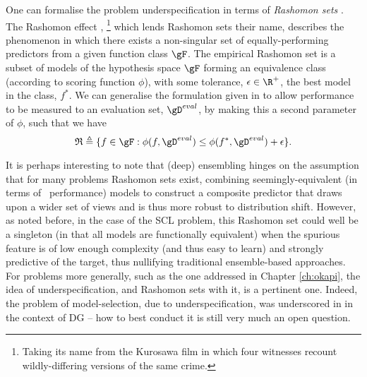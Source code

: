 %
One can formalise the problem underspecification in terms of \emph{Rashomon sets}
\citep{semenova2019study}.
The Rashomon effect \citep{breiman2001statistical},
%
\footnote{Taking its name from the Kurosawa film
in which four witnesses recount wildly-differing versions of the same crime.}
%
which lends Rashomon sets their name, describes the phenomenon in which there exists a
non-singular set of equally-performing predictors from a given function class $\gF$.
%
 The empirical Rashomon set is a subset of models of the hypothesis space $\gF$ forming an
 equivalence class (according to scoring function $\phi$), with some tolerance, $\epsilon \in \R^+$, \wrt{}
 the best model in the class, $f^\ast$. 
%
We can generalise the formulation given in \citet{semenova2019study} to allow performance to be
measured \wrt{} to an evaluation set,  $\gD^{eval}$, by making this a second parameter of
$\phi$, such that we have
%
\begin{equation*}
  \mathfrak{R} \triangleq 
  \{ 
    f \in \gF: \phi(f, \gD^{eval}) 
    \leq 
    \phi( f^\ast, \gD^{eval} ) + \epsilon 
  \}.
\end{equation*}

It is perhaps interesting to note that (deep) ensembling hinges on the assumption that for many
problems Rashomon sets exist, combining seemingly-equivalent (in terms of \iid{}\ performance)
models to construct a composite predictor that draws upon a wider set of views and is thus more
robust to distribution shift.
%
However, as noted before, in the case of the \ac{SCL} problem, this Rashomon set could well be a
singleton (in that all models are functionally equivalent) when the spurious feature is of low
enough complexity (and thus easy to learn) and strongly predictive of the target, thus nullifying
traditional ensemble-based approaches.
%
For \ood{} problems more generally, such as the one addressed in Chapter \ref{ch:okapi}, the idea
of underspecification, and Rashomon sets with it, is a pertinent one.
%
Indeed, the problem of model-selection, due to underspecification, was underscored in
\cite{gulrajani2020search} in the context of \ac{DG} -- how to best conduct it is still very much
an open question.

